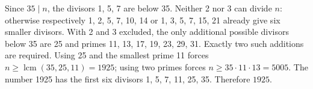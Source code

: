 Since $35\mid n$, the divisors 1, 5, 7 are below 35. Neither 2 nor 3 can divide $n$: otherwise respectively 1, 2, 5, 7, 10, 14 or 1, 3, 5, 7, 15, 21 already give six smaller divisors. With 2 and 3 excluded, the only additional possible divisors below 35 are 25 and primes 11, 13, 17, 19, 23, 29, 31. Exactly two such additions are required. Using 25 and the smallest prime 11 forces $n\ge\operatorname{lcm}(35,25,11)=1925$; using two primes forces $n\ge35\cdot11\cdot13=5005$. The number 1925 has the first six divisors 1, 5, 7, 11, 25, 35. Therefore $\boxed{1925}$.
